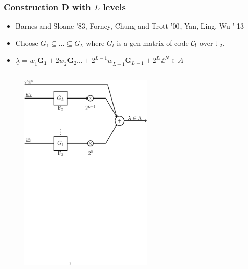 \documentclass[10pt]{beamer}
\begin{document}
\begin{frame}\frametitle{Construction D with $L$ levels}
\begin{itemize}
    \item Barnes and Sloane '83, Forney, Chung and Trott '00, Yan, Ling, Wu ' 13
				 \vspace{0.5em}
	 \item Choose  $G_{1}\subseteq \ldots \subseteq G_{L}$ where $G_{l}$ is a gen matrix of code $\mathcal{C}_{l}$ over $\mathbb{F}_{2}$.
				 \vspace{.5em}
	\item<2->  $  \underline{\lambda} = \underline{w}_1 \mathbf{G}_1 + 2 \underline{w}_2 \mathbf{G}_2 \ldots +2^{L-1} \underline{w}_{L-1} \mathbf{G}_{L-1} +2^{L}\mathbb{Z}^{N} \in \Lambda$
\end{itemize}
				\vspace{0.2in}
    \begin{columns}[t]      
 	      \begin{column}{0.6\textwidth}
            \begin{figure}
				{\includegraphics[width=2.5in]{lattice_Constr_D1.pdf}}
            \end{figure}
        \end{column}


\end{columns}
\end{frame}
\end{document}
